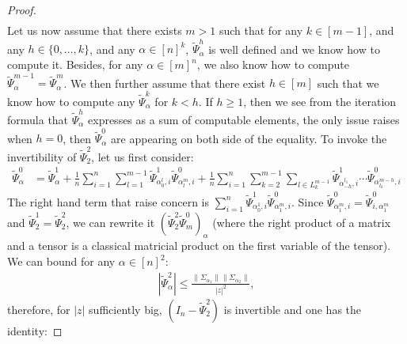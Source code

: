 \documentclass[a4papaer, titlepage]{book}
\begin{document}
\begin{proof}
\begin{align*}
   \end{align*}
   Let us now assume that there exists $m>1$ such that for any $k\in [m-1]$, and any $h\in \{0,\ldots,k\}$, and any $\alpha \in [n]^{k}$, $\tilde \Psi_\alpha^{h}$ is well defined and we know how to compute it. Besides, for any $\alpha \in [m]^n$, we also know how to compute $\tilde \Psi^{m-1}_{\alpha} = \tilde \Psi^m_{\alpha} $. We then further assume that there exist $h \in [m]$ such that we know how to compute any $\tilde \Psi^k_{\alpha} $ for $k<h$. 
   If $h\geq 1$, then we see from the iteration formula that $\tilde \Psi_\alpha^h$ expresses as a sum of computable elements, the only issue raises when $h=0$, then $\tilde \Psi_\alpha^0$ are appearing on both side of the equality. To invoke the invertibility of $\tilde \Psi_2^2$, let us first consider:
  \begin{align*}
      \tilde \Psi_\alpha^0
      &= \tilde \Psi_\alpha^{1}
      +  \frac{1}{n} \sum_{i=1}^n\sum_{l=1}^{m-1} \tilde \Psi^{1}_{\alpha_{0}^{l}, i} \tilde \Psi^0_{\alpha_{l}^{m}, i}
     + \frac{1}{n} \sum_{i=1}^n\sum_{k=2}^{m-1}\sum_{l\in L_k^{m-1}} \tilde \Psi^{1}_{\alpha_{-h}^{l_1}, i} \cdots \tilde \Psi^0_{\alpha_{l_k}^{m-h}, i}
  \end{align*} 
  The right hand term that raise concern is $\sum_{i=1}^n \tilde\Psi^{1}_{\alpha_{0}^{1}, i}\tilde \Psi^0_{\alpha_{1}^m, i}$. Since $\tilde \Psi^0_{\alpha_{1}^m, i} = \tilde \Psi^0_{i, \alpha_{1}^m}$ and $\tilde \Psi_2^1 = \tilde \Psi_2^2$, we can rewrite it $(\tilde \Psi_2^2 \tilde \Psi_m^0)_{\alpha}$ (where the right product of a matrix and a tensor is a classical matricial product on the first variable of the tensor). We can bound for any $\alpha \in [n]^2$:
  \begin{align*}
    \left\vert \tilde \Psi_\alpha^2 \right\vert
    \leq \frac{\|\Sigma_{\alpha_1}\|\|\Sigma_{\alpha_2}\|}{|z|^2},
  \end{align*}
  therefore, for $|z|$ sufficiently big, $(I_n - \tilde \Psi_2^2)$ is invertible and one has the identity:

\end{proof}
\end{document}
